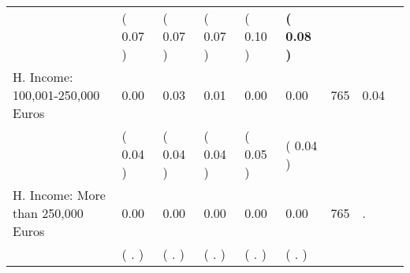 \begin{tabular}{L{6.2cm} C{1.8cm} C{1.8cm} C{1.8cm} C{1.8cm} C{1.8cm} C{1.8cm} C{0.3cm} C{0.3cm}}
 & (     0.07 ) & (     0.07 ) & (     0.07 ) & (     0.10 ) & \textbf{(     0.08 )}  & \\
H. Income: 100,001-250,000 Euros &      0.00 &      0.03 &      0.01 &      0.00 &      0.00  & 765 &       0.04 \\ 
 & (     0.04 ) & (     0.04 ) & (     0.04 ) & (     0.05 ) & (     0.04 )  & \\
H. Income: More than 250,000 Euros &      0.00 &      0.00 &      0.00 &      0.00 &      0.00  & 765 &          . \\ 
 & (        . ) & (        . ) & (        . ) & (        . ) & (        . )  & \\
\bottomrule
\end{tabular}
